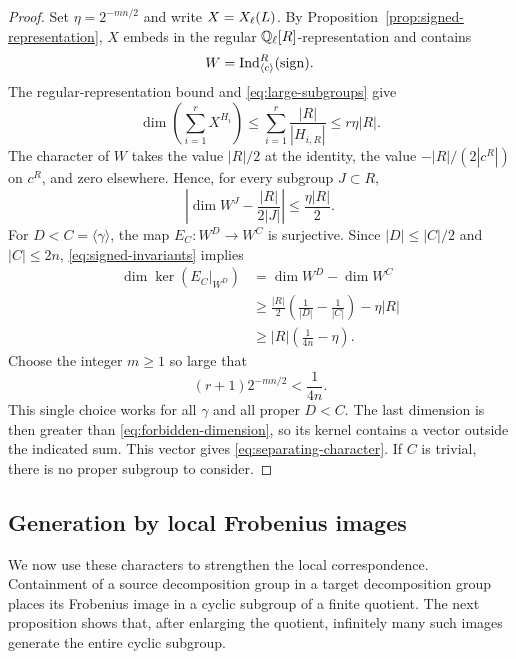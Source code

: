 \begin{proof}
Set $\eta=2^{-mn/2}$ and write $X=X_{\ell}(L)$. By
Proposition~\ref{prop:signed-representation}, $X$ embeds in the regular
$\mathbb Q_\ell[R]$-representation and contains
\[
 W=\operatorname{Ind}_{\langle c\rangle}^{R}(\operatorname{sign}).
\]
The regular-representation bound and \eqref{eq:large-subgroups} give
\begin{equation}\label{eq:forbidden-dimension}
 \dim\left(\sum_{i=1}^rX^{H_i}\right)
 \leq\sum_{i=1}^r\frac{|R|}{|H_{i,R}|}
 \leq r\eta|R|.
\end{equation}
The character of $W$ takes the value $|R|/2$ at the identity,
the value $-|R|/(2|c^R|)$ on $c^R$, and zero elsewhere.
Hence, for every subgroup $J\subset R$,
\begin{equation}\label{eq:signed-invariants}
 \left|\dim W^J-\frac{|R|}{2|J|}\right|
 \leq\frac{\eta|R|}{2}.
\end{equation}
For $D<C=\langle\gamma\rangle$, the map
$E_C:W^D\to W^C$ is surjective. Since $|D|\leq |C|/2$ and
$|C|\leq2n$, \eqref{eq:signed-invariants} implies
\begin{align*}
 \dim\ker(E_C|_{W^D})
 &=\dim W^D-\dim W^C\\
 &\geq\frac{|R|}{2}\left(\frac1{|D|}-\frac1{|C|}\right)
       -\eta|R|\\
 &\geq |R|\left(\frac1{4n}-\eta\right).
\end{align*}
Choose the integer $m\geq1$ so large that
\[
  (r+1)2^{-mn/2}<\frac1{4n}.
\]
This single choice works for all $\gamma$ and all proper $D<C$.
The last dimension is then greater than
\eqref{eq:forbidden-dimension}, so its kernel contains a vector
outside the indicated sum. This vector gives
\eqref{eq:separating-character}. If $C$ is trivial, there is no
proper subgroup to consider.
\end{proof}

\subsection{Generation by local Frobenius images}

We now use these characters to strengthen the local correspondence.
Containment of a source decomposition group in a target decomposition
group places its Frobenius image in a cyclic subgroup of a finite
quotient. The next proposition shows that, after enlarging the
quotient, infinitely many such images generate the entire cyclic
subgroup.

